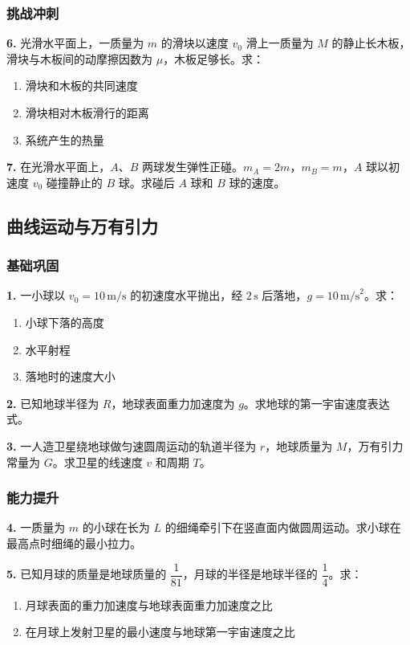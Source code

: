 \subsubsection{挑战冲刺}

\textbf{6.} 光滑水平面上，一质量为 $m$ 的滑块以速度 $v_0$ 滑上一质量为 $M$ 的静止长木板，滑块与木板间的动摩擦因数为 $\mu$，木板足够长。求：
\begin{enumerate}
  \item 滑块和木板的共同速度
  \item 滑块相对木板滑行的距离
  \item 系统产生的热量
\end{enumerate}

\textbf{7.} 在光滑水平面上，$A$、$B$ 两球发生弹性正碰。$m_A = 2m$，$m_B = m$，$A$ 球以初速度 $v_0$ 碰撞静止的 $B$ 球。求碰后 $A$ 球和 $B$ 球的速度。

\subsection{曲线运动与万有引力}

\subsubsection{基础巩固}

\textbf{1.} 一小球以 $v_0 = 10\,\text{m/s}$ 的初速度水平抛出，经 $2\,\text{s}$ 后落地，$g = 10\,\text{m/s}^2$。求：
\begin{enumerate}
  \item 小球下落的高度
  \item 水平射程
  \item 落地时的速度大小
\end{enumerate}

\textbf{2.} 已知地球半径为 $R$，地球表面重力加速度为 $g$。求地球的第一宇宙速度表达式。

\textbf{3.} 一人造卫星绕地球做匀速圆周运动的轨道半径为 $r$，地球质量为 $M$，万有引力常量为 $G$。求卫星的线速度 $v$ 和周期 $T$。

\subsubsection{能力提升}

\textbf{4.} 一质量为 $m$ 的小球在长为 $L$ 的细绳牵引下在竖直面内做圆周运动。求小球在最高点时细绳的最小拉力。

\textbf{5.} 已知月球的质量是地球质量的 $\dfrac{1}{81}$，月球的半径是地球半径的 $\dfrac{1}{4}$。求：
\begin{enumerate}
  \item 月球表面的重力加速度与地球表面重力加速度之比
  \item 在月球上发射卫星的最小速度与地球第一宇宙速度之比
\end{enumerate}


